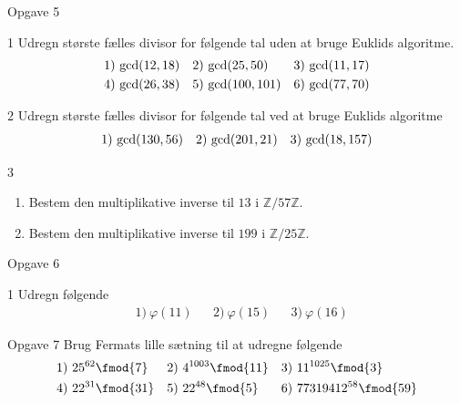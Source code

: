 %
%
%
%
%
\newpage
%
%
%
%
%
\begin{opgavetekst}{Opgave 5}
\end{opgavetekst}
\begin{delopgave}{1}
	Udregn største fælles divisor for følgende tal uden at bruge Euklids algoritme.
	\begin{align*}
		&1) \ \textnormal{gcd}(12,18)   &&2) \ \textnormal{gcd}(25,50)   &&3) \ \textnormal{gcd}(11,17)    \\
		&4) \ \textnormal{gcd}(26,38)   &&5) \ \textnormal{gcd}(100,101)    &&6) \ \textnormal{gcd}(77,70)   \\
	\end{align*}
\end{delopgave}
%
%
\begin{delopgave}{2}
	Udregn største fælles divisor for følgende tal ved at bruge Euklids algoritme
	\begin{align*}
		&1) \ \textnormal{gcd}(130,56)   &&2) \ \textnormal{gcd}(201,21)   &&3) \ \textnormal{gcd}(18,157)    \\
	\end{align*}
\end{delopgave}
%
%
\begin{delopgave}{3}
	\begin{enumerate}[label=\roman*)]
		\item Bestem den multiplikative inverse til $13$ i $\mathbb{Z}/57\mathbb{Z}$.
		\item Bestem den multiplikative inverse til $199$ i $\mathbb{Z}/25\mathbb{Z}$.
	\end{enumerate}
\end{delopgave}
%
%
%
%
%
\begin{opgavetekst}{Opgave 6}
\end{opgavetekst}
%
%
\begin{delopgave}{1}
	Udregn følgende
	\begin{align*}
		&1) \ \varphi(11)   &&2) \ \varphi(15)   &&3) \ \varphi(16)
	\end{align*}	 
\end{delopgave}
%
%
%
%
%
\begin{opgavetekst}{Opgave 7}
	Brug Fermats lille sætning til at udregne følgende
	\begin{align*}
		&1) \ 25^{62} \fmod{7}   &&2) \ 4^{1003} \fmod{11}   &&3) \ 11^{1025} \fmod{3} \\
		&4) \ 22^{31} \fmod{31}   &&5) \ 22^{48} \fmod{5}   &&6) \ 77319412^{58} \fmod{59}
	\end{align*}	 
\end{opgavetekst}